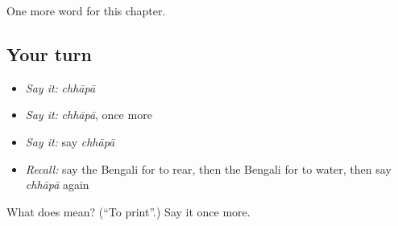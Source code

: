 \begin{grammarlens}[title={What you've built}]
One more word for this chapter.
\end{grammarlens}

\subsection*{Your turn}
\begin{itemize}
\raggedright
  \item \emph{Say it:} \emph{chhāpā}
  \item \emph{Say it:} \emph{chhāpā}, once more
  \item \emph{Say it:} say \emph{chhāpā}
  \item \emph{Recall:} say the Bengali for to rear, then the Bengali for to water, then say \emph{chhāpā} again
\end{itemize}

\begin{tcolorbox}[breakable,colback=teal!4,colframe=teal!35!black,title={Before you move on}]
What does  mean? (\textquotedblleft{}To print\textquotedblright{}.) Say it once more.
\end{tcolorbox}
